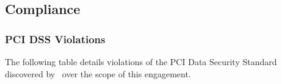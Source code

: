 \clearpage
\subsection{Compliance}
\subsubsection{PCI DSS Violations}
\label{sec:compliance}

    The following table details violations of the PCI Data Security Standard discovered by \teamname\ over the scope of this engagement.
    
